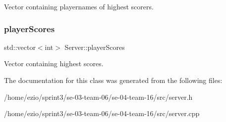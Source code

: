 Vector containing playernames of highest scorers. \mbox{\label{classServer_ae3bc58033f416d6bb1ff65e37b75fdc0}} 
\subsubsection{\texorpdfstring{player\+Scores}{playerScores}}
{\footnotesize\ttfamily std\+::vector$<$int$>$ Server\+::player\+Scores}

Vector containing highest scores. 

The documentation for this class was generated from the following files\+:\begin{DoxyCompactItemize}
\item 
/home/ezio/sprint3/se-\/03-\/team-\/06/se-\/04-\/team-\/16/src/server.\+h\item 
/home/ezio/sprint3/se-\/03-\/team-\/06/se-\/04-\/team-\/16/src/server.\+cpp\end{DoxyCompactItemize}
